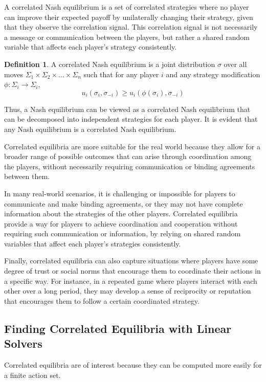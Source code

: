 \documentclass[preprint,12pt,authoryear,doubleblind]{elsarticle}
\theoremstyle{definition}
\newtheorem{definition}{Definition}[section]
\begin{document}
A correlated Nash equilibrium is a set of correlated strategies where no player can improve their expected payoff by unilaterally changing their strategy, given that they observe the correlation signal. This correlation signal is not necessarily a message or communication between the players, but rather a shared random variable that affects each player's strategy consistently.

\begin{definition}
\label{def:cor}
A correlated Nash equilibrium is a joint distribution $\sigma$ over all moves $\Sigma_1 \times \Sigma_2 \times \ldots \times \Sigma_n$ such that for any player $i$ and any strategy modification $\phi: \Sigma_i \rightarrow \Sigma_i$, $$u_i(\sigma_i, \sigma_{-i}) \ge u_i(\phi(\sigma_i), \sigma_{-i})$$
\end{definition}

Thus, a Nash equilibrium can be viewed as a correlated Nash equilibrium that can be decomposed into independent strategies for each player. It is evident that any Nash equilibrium is a correlated Nash equilibrium.

Correlated equilibria are more suitable for the real world because they allow for a broader range of possible outcomes that can arise through coordination among the players, without necessarily requiring communication or binding agreements between them.

In many real-world scenarios, it is challenging or impossible for players to communicate and make binding agreements, or they may not have complete information about the strategies of the other players. Correlated equilibria provide a way for players to achieve coordination and cooperation without requiring such communication or information, by relying on shared random variables that affect each player's strategies consistently.

Finally, correlated equilibria can also capture situations where players have some degree of trust or social norms that encourage them to coordinate their actions in a specific way. For instance, in a repeated game where players interact with each other over a long period, they may develop a sense of reciprocity or reputation that encourages them to follow a certain coordinated strategy.

\subsection{Finding Correlated Equilibria with Linear Solvers}
\label{sec:linear}
Correlated equilibria are of interest because they can be computed more easily for a finite action set.
\end{document}
